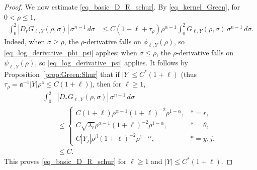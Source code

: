 \documentclass[12pt]{amsart}
\begin{document}
\begin{proof}
We now estimate \eqref{eq_basic_D_R_schur}. By \eqref{eq_kernel_Green}, for
$0<\rho\le 1$,
\begin{align}\label{D:bdd:G}
    \int_0^2
        |D_r G_{\ell,Y}(\rho,\sigma)|
    \, \sigma^{n-1} \, d\sigma
    &\le
    C (1+\ell+\tau_\rho) \rho^{\alpha-1}
    \int_0^2
        G_{\ell,Y}(\rho,\sigma)
    \, \sigma^{n-1} \, d\sigma.
\end{align}
Indeed, when $\sigma\ge \rho$, the $\rho$-derivative falls on $\phi_{\ell,Y}(\rho)$, so \eqref{eq_log_derivative_phi_psi} applies; when $\sigma\le \rho$, the $\rho$-derivative falls on $\psi_{\ell,Y}(\rho)$, so \eqref{eq_log_derivative_psi} applies. It follows by Proposition~\ref{prop:Green:Shur} that if $|Y|\le C^*(1+\ell)$ (thus $\tau_\rho = \mathfrak a^{-1} |Y| \rho^{\mathfrak a} \le C(1+\ell)$), then for $\ell\ge 1$,
\begin{align*}
    \int_0^2 &|D_* G_{\ell,Y}(\rho,\sigma)| \, \sigma^{n-1} \, d\sigma \\
    &\le  \begin{cases}
        C (1+\ell)\rho^{\alpha-1} (1+\ell)^{-2}\rho^{1-\alpha}, & *=r,\\
    C\sqrt{\lambda_\ell} \rho^{\alpha-1} (1+\ell)^{-2}\rho^{1-\alpha}, & *=\theta,\\
    C|Y_j|\rho^\beta (1+\ell)^{-2}\rho^{1-\alpha}, & *=y,j.
    \end{cases}\\
    &\le C.
\end{align*}
This proves \eqref{eq_basic_D_R_schur} for $\ell\ge 1$ and $|Y|\le C^*(1+\ell)$.


\end{proof}
\end{document}
